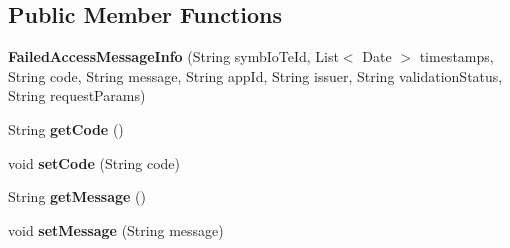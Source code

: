 \subsection*{Public Member Functions}
\begin{DoxyCompactItemize}
\item 
\mbox{\label{classeu_1_1h2020_1_1symbiote_1_1core_1_1cci_1_1accessNotificationMessages_1_1FailedAccessMessageInfo_a9e2485fd6fb7e9ac20f0d644530a5d2d}} 
{\bfseries Failed\+Access\+Message\+Info} (String symb\+Io\+Te\+Id, List$<$ Date $>$ timestamps, String code, String message, String app\+Id, String issuer, String validation\+Status, String request\+Params)
\item 
\mbox{\label{classeu_1_1h2020_1_1symbiote_1_1core_1_1cci_1_1accessNotificationMessages_1_1FailedAccessMessageInfo_a9a9ffca7f55634087e23c8b2a3a416ce}} 
String {\bfseries get\+Code} ()
\item 
\mbox{\label{classeu_1_1h2020_1_1symbiote_1_1core_1_1cci_1_1accessNotificationMessages_1_1FailedAccessMessageInfo_ab91fb9deaf37b08e46ecf7acabf22ea3}} 
void {\bfseries set\+Code} (String code)
\item 
\mbox{\label{classeu_1_1h2020_1_1symbiote_1_1core_1_1cci_1_1accessNotificationMessages_1_1FailedAccessMessageInfo_ae3c177274b052880af782815c23ba25d}} 
String {\bfseries get\+Message} ()
\item 
\mbox{\label{classeu_1_1h2020_1_1symbiote_1_1core_1_1cci_1_1accessNotificationMessages_1_1FailedAccessMessageInfo_a791872a32cea4637c23749a0836a04b1}} 
void {\bfseries set\+Message} (String message)
\item 
\mbox{\label{classeu_1_1h2020_1_1symbiote_1_1core_1_1cci_1_1accessNotificationMessages_1_1FailedAccessMessageInfo_ab7f8e7c773ed9d52b62a1851be086c6f}} 

\end{DoxyCompactItemize}
